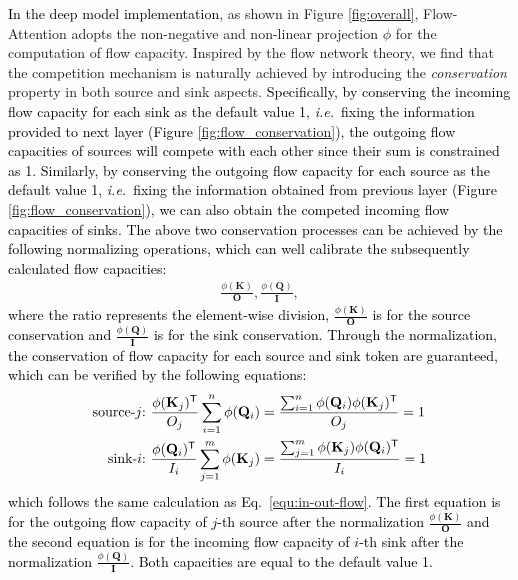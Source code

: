 \documentclass[nohyperref]{article}
\theoremstyle{plain}
\theoremstyle{definition}
\theoremstyle{remark}
\newcommand{\update}[1]{{\textcolor{black}{#1}}}
\begin{document}
\update{In the deep model implementation}, as shown in Figure \ref{fig:overall}, Flow-Attention adopts the non-negative and non-linear projection $\phi$ for the computation of flow capacity. Inspired by the flow network theory, we find that the competition mechanism is naturally achieved by introducing the \emph{conservation} property in both source and sink aspects. \update{Specifically, by conserving the incoming flow capacity for each sink as the default value 1, \emph{i.e.}~fixing the information provided to next layer (Figure \ref{fig:flow_conservation}), the outgoing flow capacities of sources will compete with each other since their sum is constrained as 1. Similarly, by conserving the outgoing flow capacity for each source as the default value 1, \emph{i.e.}~fixing the information obtained from previous layer (Figure \ref{fig:flow_conservation}), we can also obtain the competed incoming flow capacities of sinks. The above two conservation processes can be achieved by the following normalizing operations, which can well calibrate the subsequently calculated flow capacities:}
\begin{equation}
	\begin{split}\label{equ:reweighting}
	    \frac{\phi(\mathbf{K})}{\mathbf{O}}, \frac{\phi(\mathbf{Q})}{\mathbf{I}},
	\end{split}
\end{equation}
\update{where the ratio represents the element-wise division, $\frac{\phi(\mathbf{K})}{\mathbf{O}}$ is for the source conservation and $\frac{\phi(\mathbf{Q})}{\mathbf{I}}$ is for the sink conservation.
Through the normalization, the conservation of flow capacity for each source and sink token are guaranteed, which can be verified by the following equations:}
\begin{equation}
	\begin{split}\label{equ:conservation_proof}
	    \text{source-$j$:}\ & \frac{\phi(\mathbf{K}_{j})^{\sf T}}{{O}_{j}}\sum_{i=1}^{n}\phi(\mathbf{Q}_{i})=\frac{\sum_{i=1}^{n}\phi(\mathbf{Q}_{i})\phi(\mathbf{K}_{j})^{\sf T}}{{O}_{j}}=1 \\
	    \text{sink-$i$:}\ &
	    \frac{\phi(\mathbf{Q}_{i})^{\sf T}}{{I}_{i}}\sum_{j=1}^{m}\phi(\mathbf{K}_{j})=\frac{\sum_{j=1}^{m}\phi(\mathbf{K}_{j})\phi(\mathbf{Q}_{i})^{\sf T}}{{I}_{i}}=1\\
	\end{split}
\end{equation}
\update{which follows the same calculation as Eq.~\eqref{equ:in-out-flow}. The first equation is for the outgoing flow capacity of $j$-th source after the normalization $\frac{\phi(\mathbf{K})}{\mathbf{O}}$ and the second equation is for the incoming flow capacity of $i$-th sink after the normalization $\frac{\phi(\mathbf{Q})}{\mathbf{I}}$. Both capacities are equal to the default value 1.}
\end{document}
